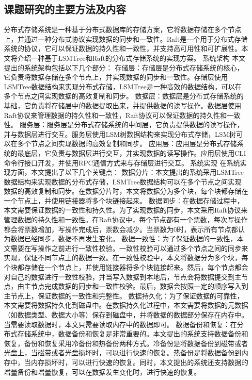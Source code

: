   	\subsection{课题研究的主要方法及内容}

  
  	分布式存储系统是一种基于分布式数据库的存储方案，它将数据存储在多个节点上，并通过一种分布式协议实现数据的同步和一致性。Raft是一个用于分布式存储系统的协议，它可以保证数据的持久性和一致性，并支持高可用性和可扩展性。本文将介绍一种基于LSMTree和Raft的分布式存储系统的实现方案。
系统架构
本文提出的系统架构包括以下几个部分：
存储层：存储层是分布式存储系统的核心，它负责将数据存储在多个节点上，并实现数据的同步和一致性。存储层使用LSMTree数据结构来实现分布式存储，LSMTree是一种高效的数据结构，可以在多个节点之间实现数据的高效复制和同步。
数据层：数据层是分布式存储系统的基础，它负责将存储层中的数据提取出来，并提供数据的读写操作。数据层使用Raft协议来管理数据的持久性和一致性，Raft协议可以保证数据的持久性和一致性。
服务层：服务层是分布式存储系统的中间层，它负责提供数据的读写操作，并与数据层进行交互。服务层使用LSM树数据结构来实现分布式存储，LSM树可以在多个节点之间实现数据的高效复制和同步。
应用层：应用层是分布式存储系统的最底层，它负责与数据层进行交互，并实现数据的读写操作。应用层使用CLI命令行接口开发，并使用RPC通信方式来与存储层进行交互。
系统实现
在系统实现方面，本文提出了以下几个关键点：
数据分片：本文提出的系统采用LSMTree数据结构来实现数据的分布式存储，LSMTree数据结构可以在多个节点之间实现数据的高效复制和同步。在数据分片时，本文将数据分为多个块，每个块都存储在一个节点上，并使用链接器将多个块链接起来。
数据同步：在数据存储过程中，本文需要保证数据的一致性和持久性。为了实现数据的同步，本文采用Raft协议来管理数据的持久性和一致性。在Raft协议中，每个节点都有一个票数，每次写操作都会将票数增加，写操作完成后，票数会减少。当票数为0时，表示所有节点都认为数据已经同步，数据不再发生变化。
数据一致性：为了保证数据的一致性，本文需要在写操作之前进行一致性校验。一致性校验可以通过多个节点之间的同步来实现，保证不同节点上的数据一致。在一致性校验中，本文将数据分为多个块，每个块都存储在一个节点上，并使用链接器将多个块链接起来。然后，每个节点都会对自己的数据进行一致性校验，并当写入数据到本地后，节点会将数据提交到主节点，由主节点完成数据的同步和一致性校验。最后，数据会按照一定的顺序写入到主节点上，保证数据的一致性和完整性。
数据持久化：为了保证数据的可靠性，本文需要将数据持久化到磁盘中。在数据持久化过程中，本文需要将数据的元数据（如数据类型、数据大小等）保存到磁盘中，并将数据的数据部分保存在内存中。当需要读取数据时，本文只需要读取内存中的数据即可。
数据备份和恢复：在分布式存储系统中，数据备份和恢复是非常重要的。本文提出的系统支持数据备份和恢复，备份和恢复采用冷备份和热备份两种方式。冷备份是将数据备份到磁带或者光盘上，当磁带或者光盘损坏时，可以进行快速的恢复。热备份是将数据备份到内存中，当内存损坏时，可以进行快速的恢复。同时，本文提出的系统还支持数据的增量备份和增量恢复，可以在数据发生变化时，进行快速的恢复。
